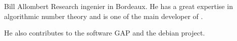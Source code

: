 \begin{participant}[type=PI,PM=6,salary=6000,gender=male]{Bill Allombert}
Research ingenier in Bordeaux. He has a great expertise in
algorithmic number theory and is one of the main developer of \PariGP.

He also contributes to the software GAP and the debian project.
\end{participant}

